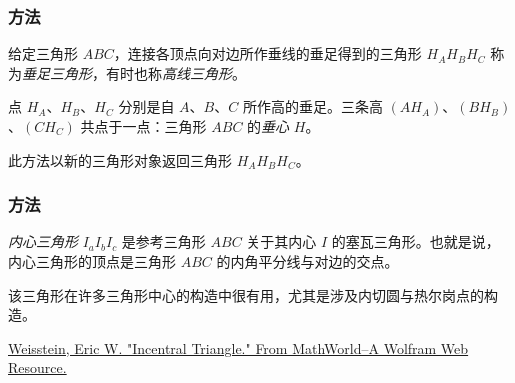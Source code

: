 \subsubsection{方法 }
\label{ssub:method_triangle_orthic}

给定三角形 $ABC$，连接各顶点向对边所作垂线的垂足得到的三角形 $H_AH_BH_C$ 称为\emph{垂足三角形}，有时也称\emph{高线三角形}。

点 $H_A$、$H_B$、$H_C$ 分别是自 $A$、$B$、$C$ 所作高的垂足。三条高 $(AH_A)$、$(BH_B)$、$(CH_C)$ 共点于一点：三角形 $ABC$ 的\emph{垂心} $H$。

此方法以新的三角形对象返回三角形 $H_AH_BH_C$。

\vspace{1em}

\begin{tkzexample}[latex=8cm]
\end{tkzexample}

\subsubsection{方法 }
\label{ssub:method_incentral}

\emph{内心三角形} $I_aI_bI_c$ 是参考三角形 $ABC$ 关于其内心 $I$ 的塞瓦三角形。也就是说，内心三角形的顶点是三角形 $ABC$ 的内角平分线与对边的交点。

该三角形在许多三角形中心的构造中很有用，尤其是涉及内切圆与热尔岗点的构造。\begin{flushright}
  \small
\href{[URL1]}{Weisstein, Eric W. "Incentral Triangle." From MathWorld--A Wolfram Web Resource.}
\end{flushright}

\vspace{1em}

